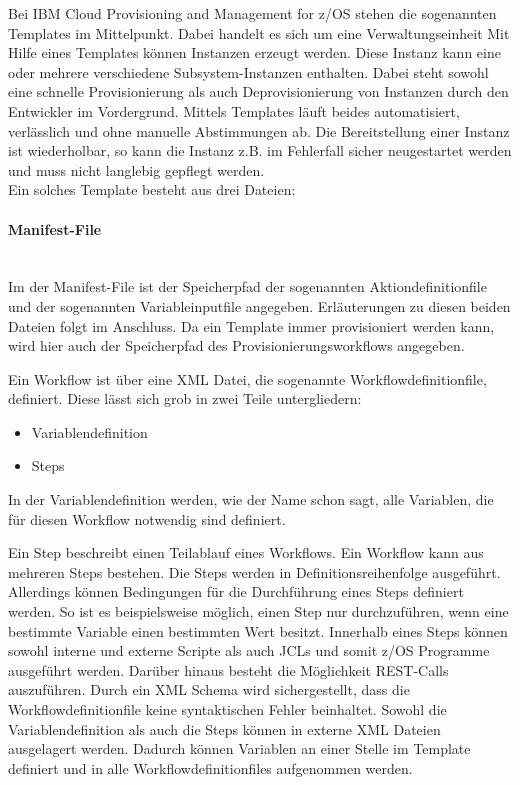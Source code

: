 Bei \glqq IBM Cloud Provisioning and Management for z/OS\grqq{} stehen die sogenannten \glqq Templates\grqq{} im Mittelpunkt.
Dabei handelt es sich um eine Verwaltungseinheit
Mit Hilfe eines Templates können Instanzen erzeugt werden.
Diese Instanz kann eine oder mehrere verschiedene Subsystem-Instanzen enthalten.
Dabei steht sowohl eine schnelle Provisionierung als auch Deprovisionierung von Instanzen durch den Entwickler im Vordergrund.
Mittels Templates läuft beides automatisiert, verlässlich und ohne manuelle Abstimmungen ab.
Die Bereitstellung einer Instanz ist wiederholbar, so kann die Instanz z.B. im Fehlerfall sicher neugestartet werden und muss nicht langlebig gepflegt werden.
\\ Ein solches Template besteht aus drei Dateien:

\paragraph{\glqq Manifest-File\grqq} ~\\
Im der Manifest-File ist der Speicherpfad der sogenannten \glqq Aktiondefinitionfile\grqq{} und der sogenannten \glqq Variableinputfile\grqq{} angegeben.
Erläuterungen zu diesen beiden Dateien folgt im Anschluss.
Da ein Template immer provisioniert werden kann, wird hier auch der Speicherpfad des Provisionierungsworkflows angegeben.
\cite{IBM.2019}

Ein Workflow ist über eine XML Datei, die sogenannte \glqq Workflowdefinitionfile\grqq, definiert.
Diese lässt sich grob in zwei Teile untergliedern:
\begin{itemize}
\item Variablendefinition
\item Steps
\end{itemize}
In der Variablendefinition werden, wie der Name schon sagt, alle Variablen, die für diesen Workflow notwendig sind definiert.

Ein Step beschreibt einen Teilablauf eines Workflows.
Ein Workflow kann aus mehreren Steps bestehen.
Die Steps werden in Definitionsreihenfolge ausgeführt.
Allerdings können Bedingungen für die Durchführung eines Steps definiert werden.
So ist es beispielsweise möglich, einen Step nur durchzuführen, wenn eine bestimmte Variable einen bestimmten Wert besitzt.
Innerhalb eines Steps können sowohl interne und externe Scripte als auch JCLs und somit z/OS Programme ausgeführt werden.
Darüber hinaus besteht die Möglichkeit REST-Calls auszuführen.
Durch ein XML Schema wird sichergestellt, dass die Workflowdefinitionfile keine syntaktischen Fehler beinhaltet.
Sowohl die Variablendefinition als auch die Steps können in externe XML Dateien ausgelagert werden.
Dadurch können Variablen an einer Stelle im Template definiert und in alle Workflowdefinitionfiles aufgenommen werden.
\cite{Rotthove.2018}

